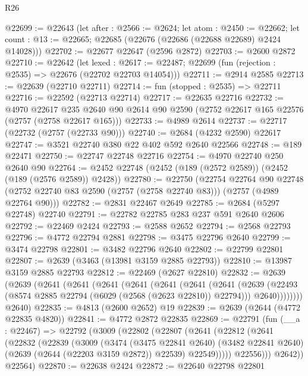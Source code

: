 \begin{lexlean}{R26}
\begin{coremodule}
@22699 := @22643
    (let after : @2566 := @2624;
    let atom : @2450 := @22662;
    let count : @13 := @22665; @22685 (@22676 (@22686 (@22688 @22689) @2424 @14028)))
@22702 := @22677 @22647 (@2596 @2872)
@22703 := @2600 @2872
@22710 := @22642
    (let lexed : @2617 := @22487; @22699 (fun (rejection : @2535) => @22676 (@22702 @22703 @14054)))
@22711 := @2914 @2585
@22713 := @22639 (@22710 @22711)
@22714 := fun (stopped : @2535) => @22711
@22716 := @22592 (@22713 @22714)
@22717 := @22635 @22716
@22732 := @4970
    @22617
    @235
    @2640
    @90
    @2614
    @90
    @2590
    (@2752 @22617 @165 @22576 (@2757 (@2758 @22617 @165)))
@22733 := @4989 @2614
@22737 := @22717 (@22732 (@2757 (@22733 @90)))
@22740 := @2684 (@4232 @2590) @22617
@22747 := @3521 @22740 @380 @22 @402 @592 @2640 @22566
@22748 := @189 @22471
@22750 := @22747 @22748 @22716
@22754 := @4970 @22740 @250 @2640 @90
@22764 := @2452 @22748 (@2452 (@189 (@2572 @2589)) (@2452 (@189 (@2576 @2589)) @2428))
@22780 := @22750
    (@22754
      @22764
      @90
      @22748
      (@2752 @22740 @83 @2590 (@2757 (@2758 @22740 @83)))
      (@2757 (@4989 @22764 @90)))
@22782 := @2831 @22467 @2649
@22785 := @2684 (@5297 @22748) @22740
@22791 := @22782 @22785 @283 @237 @591 @2640 @2606
@22792 := @22469 @2424
@22793 := @2588 @2652
@22794 := @2568 @22793
@22796 := @4772 @22794 @2881
@22798 := @3475 @22796 @2640
@22799 := @3474 @22798
@22801 := @3482 @22796 @2640
@22802 := @22799 @22801
@22807 := @2639 (@3463 (@13981 @3159 @2885 @22793))
@22810 := @13987 @3159 @2885 @22793
@22812 := @22469 (@2627 @22810)
@22832 := @2639
    (@2639
      (@2641
        (@2641
          (@2641
            (@2641
              (@2641
                (@2641
                  (@2641
                    (@2639
                      (@22493 (@8574 @2885 @22794 (@6029 (@2568 (@2623 @22810)) @22794)))
                      @2640))))))))
      @2640)
@22835 := @4813 (@2600 @2652) @19
@22839 := @2639 (@2644 (@4772 @22835 @4820))
@22841 := @4772 @2872 @22835
@22869 := @22791
    (fun (__a : @22467) =>
    @22792
      (@3009
        (@22802
          (@22807
            (@2641
              (@22812
                (@2641
                  (@22832
                    (@22839
                      (@3009
                        (@3474
                          (@3475 @22841 @2640)
                          (@3482 @22841 @2640)
                          (@2639 (@2644 (@22203 @3159 @2872)) @22539)
                          @22549)))))
                @22556)))
          @2642))
      @22564)
@22870 := @22638 @2424
@22872 := @22640 @22798 @22801

\end{coremodule}
\end{lexlean}

